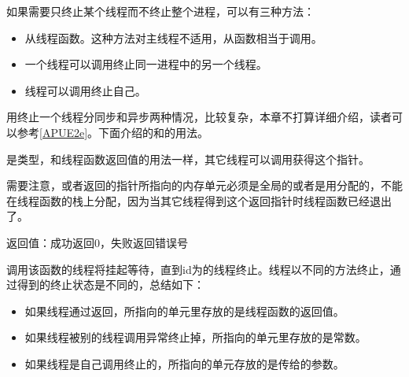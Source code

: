 如果需要只终止某个线程而不终止整个进程，可以有三种方法：


\begin{itemize}

\item 从线程函数。这种方法对主线程不适用，从函数相当于调用。

\item 一个线程可以调用终止同一进程中的另一个线程。

\item 线程可以调用终止自己。
\end{itemize}


用终止一个线程分同步和异步两种情况，比较复杂，本章不打算详细介绍，读者可以参考\hyperlink{db.bi01.bibli.apue}{[APUE2e]}。下面介绍的和的用法。




是类型，和线程函数返回值的用法一样，其它线程可以调用获得这个指针。



需要注意，或者返回的指针所指向的内存单元必须是全局的或者是用分配的，不能在线程函数的栈上分配，因为当其它线程得到这个返回指针时线程函数已经退出了。




返回值：成功返回0，失败返回错误号



调用该函数的线程将挂起等待，直到id为的线程终止。线程以不同的方法终止，通过得到的终止状态是不同的，总结如下：


\begin{itemize}

\item 如果线程通过返回，所指向的单元里存放的是线程函数的返回值。

\item 如果线程被别的线程调用异常终止掉，所指向的单元里存放的是常数。

\item 如果线程是自己调用终止的，所指向的单元存放的是传给的参数。
\end{itemize}


